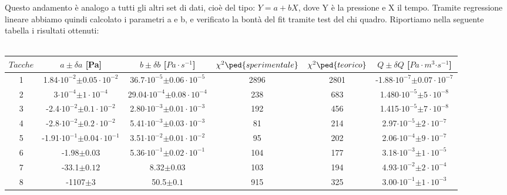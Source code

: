 \documentclass[a4paper,11pt]{article}
\begin{document}
Questo andamento è analogo a tutti gli altri set di dati, cioè del tipo: $Y=a+bX$, dove Y è la pressione e X il tempo. Tramite regressione lineare abbiamo quindi calcolato i parametri a e b, e verificato la bontà del fit tramite test del chi quadro. Riportiamo nella seguente tabella i risultati ottenuti:\\
\vspace{10 px}\\

\hspace{-30 pt}
\begin{tabular}{|c|c|c|c|c|c|}
\hline $Tacche$ & $a\pm$$\delta a$ [Pa] & $b\pm$$\delta b$ [$Pa \cdot s^{-1}$] & $\chi^{2}\ped{sperimentale}$ & $\chi^{2}\ped{teorico}$ & $Q\pm\delta Q$ [$Pa\cdot m^{3}$$\cdot s^{-1}$] \\ 
\hline 1 & 1.84$\cdot10^{-2}$$\pm 0.05\cdot10^{-2}$ &  36.7$\cdot10^{-5}$$\pm 0.06\cdot10^{-5}$ & 2896 & 2801 & -1.88$\cdot10^{-7}$$\pm 0.07\cdot10^{-7}$ \\ 
\hline 2 & 3$\cdot10^{-4}$$\pm 1\cdot10^{-4}$ & 29.04$\cdot10^{-4}$$\pm 0.08\cdot10^{-4}$ & 238 & 683 & 1.480$\cdot10^{-5}$$\pm 5\cdot10^{-8}$ \\ 
\hline 3 & -2.4$\cdot10^{-2}$$\pm 0.1\cdot10^{-2}$ &  2.80$\cdot10^{-3}$$\pm 0.01\cdot10^{-3}$ & 192 & 456 & 1.415$\cdot10^{-5}$$\pm 7\cdot10^{-8}$ \\ 
\hline 4 & -2.8$\cdot10^{-2}$$\pm 0.2\cdot10^{-2}$ &  5.41$\cdot10^{-3}$$\pm 0.03\cdot10^{-3}$ & 81 & 214 & 2.97$\cdot10^{-5}$$\pm 2\cdot10^{-7}$ \\ 
\hline 5 & -1.91$\cdot10^{-1}$$\pm 0.04\cdot10^{-1}$ & 3.51$\cdot10^{-2}$$\pm 0.01\cdot10^{-2}$ & 95 & 202 & 2.06$\cdot10^{-4}$$\pm 9\cdot10^{-7}$ \\ 
\hline 6 & -1.98$\pm 0.03$  & 5.36$\cdot10^{-1}$$\pm 0.02\cdot10^{-1}$ & 104 & 177 & 3.18$\cdot10^{-3}$$\pm 1\cdot10^{-5}$ \\ 
\hline 7 & -33.1$\pm 0.12$ & 8.32$\pm 0.03$ & 103 & 194 & 4.93$\cdot10^{-2}$$\pm 2\cdot10^{-4}$ \\ 
\hline 8 & -1107$\pm 3$ & 50.5$\pm 0.1$  & 915 & 325 & 3.00$\cdot10^{-1}$$\pm 1\cdot10^{-3}$ \\ 
\hline 
\end{tabular} \\
\\
\\
\end{document}
